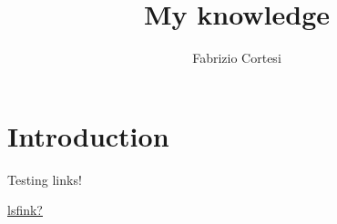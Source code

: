 \documentclass{article}
\title{My knowledge}
\author{Fabrizio Cortesi}
\begin{document}
\maketitle

\section*{Introduction}

Testing links!

\href{run:./link.pdf}{lsfink?}
\end{document}

